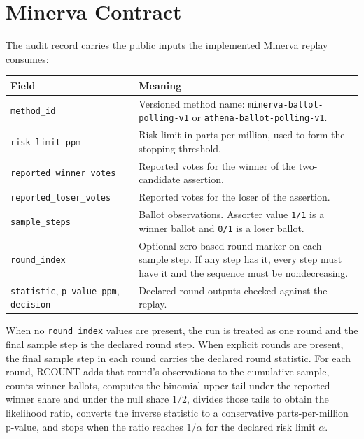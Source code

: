 \section{Minerva Contract}

The audit record carries the public inputs the implemented Minerva replay
consumes:

\begin{center}
\small
\begin{tabularx}{\textwidth}{lX}
\toprule
Field & Meaning \\
\midrule
\texttt{method\_id} & Versioned method name: \texttt{minerva-ballot-polling-v1} or \texttt{athena-ballot-polling-v1}. \\
\texttt{risk\_limit\_ppm} & Risk limit in parts per million, used to form the stopping threshold. \\
\texttt{reported\_winner\_votes} & Reported votes for the winner of the two-candidate assertion. \\
\texttt{reported\_loser\_votes} & Reported votes for the loser of the assertion. \\
\texttt{sample\_steps} & Ballot observations. Assorter value \texttt{1/1} is a winner ballot and \texttt{0/1} is a loser ballot. \\
\texttt{round\_index} & Optional zero-based round marker on each sample step. If any step has it, every step must have it and the sequence must be nondecreasing. \\
\texttt{statistic}, \texttt{p\_value\_ppm}, \texttt{decision} & Declared round outputs checked against the replay. \\
\bottomrule
\end{tabularx}
\end{center}

When no \texttt{round\_index} values are present, the run is treated as one
round and the final sample step is the declared round step. When explicit
rounds are present, the final sample step in each round carries the declared
round statistic. For each round, RCOUNT adds that round's observations to the
cumulative sample, counts winner ballots, computes the binomial upper tail
under the reported winner share and under the null share $1/2$, divides those
tails to obtain the likelihood ratio, converts the inverse statistic to a
conservative parts-per-million p-value, and stops when the ratio reaches
$1/\alpha$ for the declared risk limit $\alpha$.
